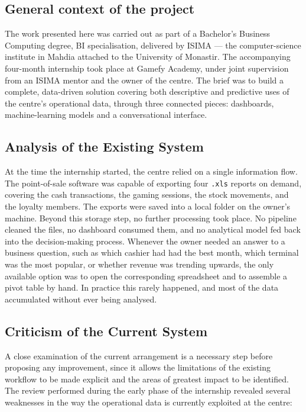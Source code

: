 \documentclass[12pt, a4paper]{report}
\begin{document}
\subsection{General context of the project}

The work presented here was carried out as part of a Bachelor's
Business Computing degree, BI specialisation, delivered
by ISIMA --- the computer-science institute in Mahdia attached to the
University of Monastir. The accompanying four-month internship took
place at Gamefy Academy, under joint supervision from an ISIMA mentor
and the owner of the centre. The brief was to build a complete,
data-driven solution covering both descriptive and predictive uses of
the centre's operational data, through three connected pieces:
dashboards, machine-learning models and a conversational interface.

\subsection{Analysis of the Existing System}

At the time the internship started, the centre relied on a single
information flow. The point-of-sale software was capable of exporting four
\texttt{.xls} reports on demand, covering the cash transactions, the gaming
sessions, the stock movements, and the loyalty members. The exports were
saved into a local folder on the owner's machine. Beyond this storage step,
no further processing took place. No pipeline cleaned the files, no
dashboard consumed them, and no analytical model fed back into the
decision-making process. Whenever the owner needed an answer to a business
question, such as which cashier had had the best month, which terminal was
the most popular, or whether revenue was trending upwards, the only available
option was to open the corresponding spreadsheet and to assemble a pivot
table by hand. In practice this rarely happened, and most of the data
accumulated without ever being analysed.

\subsection{Criticism of the Current System}

A close examination of the current arrangement is a necessary step before
proposing any improvement, since it allows the limitations of the existing
workflow to be made explicit and the areas of greatest impact to be
identified. The review performed during the early phase of the internship
revealed several weaknesses in the way the operational data is currently
exploited at the centre:
\end{document}
